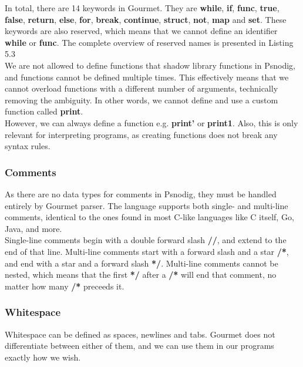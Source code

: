In total, there are 14 keywords in Gourmet. They are \textbf{while}, \textbf{if}, \textbf{func}, \textbf{true}, \textbf{false}, \textbf{return}, \textbf{else}, \textbf{for}, \textbf{break}, \textbf{continue}, \textbf{struct}, \textbf{not}, \textbf{map} and \textbf{set}. These keywords are also reserved, which means that we cannot define an identifier \textbf{while} or \textbf{func}. The complete overview of reserved names is presented in Listing 5.3 \hfill \\

We are not allowed to define functions that shadow library functions in Psnodig, and functions cannot be defined multiple times. This effectively means that we cannot overload functions with a different number of arguments, technically removing the ambiguity. In other words, we cannot define and use a custom function called \textbf{print}. \hfill \\

However, we can always define a function e.g. \textbf{print’} or \textbf{print1}. Also, this is only relevant for interpreting programs, as creating functions does not break any syntax rules.

\subsubsection{Comments}

As there are no data types for comments in Psnodig, they must be handled entirely by Gourmet parser. The language supports both single- and multi-line comments, identical to the ones found in most C-like languages like C itself, Go, Java, and more. \hfill \\

Single-line comments begin with a double forward slash \textbf{//}, and extend to the end of that line. Multi-line comments start with a forward slash and a star \textbf{/*}, and end with a star and a forward slash \textbf{*/}. Multi-line comments cannot be nested, which means that the first \textbf{*/} after a \textbf{/*} will end that comment, no matter how many \textbf{/*} preceeds it. \hfill \\

\subsubsection{Whitespace}

Whitespace can be defined as spaces, newlines and tabs. Gourmet does not differentiate between either of them, and we can use them in our programs exactly how we wish. \hfill \\

